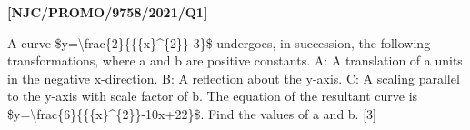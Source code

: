 \item \textbf{{[}NJC/PROMO/9758/2021/Q1{]} }

A curve \$y=\textbackslash frac\{2\}\{\{\{x\}\textasciicircum\{2\}\}-3\}\$
undergoes, in succession, the following transformations, where a and
b are positive constants. A: A translation of a units in the negative
x-direction. B: A reflection about the y-axis. C: A scaling parallel
to the y-axis with scale factor of b. The equation of the resultant
curve is \$y=\textbackslash frac\{6\}\{\{\{x\}\textasciicircum\{2\}\}-10x+22\}\$.
Find the values of a and b. {[}3{]}